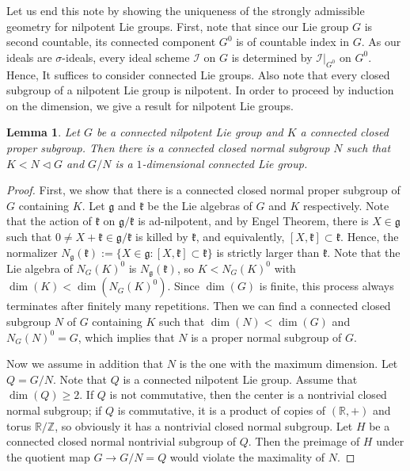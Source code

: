 \documentclass{article}
\newtheorem{lemma}[definition]{Lemma}
\newcommand{\Z}{\mathbb{Z}}
\newcommand{\R}{\mathbb{R}}
\newcommand{\I}{\mathcal{I}}
\begin{document}
Let us end this note by showing the uniqueness of the strongly admissible geometry for nilpotent Lie groups. First, note that since our Lie group $G$ is second countable, its connected component $G^0$ is of countable index in $G$. As our ideals are $\sigma$-ideals, every ideal scheme $\I$ on $G$ is determined by $\I|_{G^0}$ on $G^0$. Hence, It suffices to consider connected Lie groups. Also note that every closed subgroup of a nilpotent Lie group is nilpotent. In order to proceed by induction on the dimension, we give a result for nilpotent Lie groups.

\begin{lemma}
Let $G$ be a connected nilpotent Lie group and $K$ a connected closed proper  subgroup. Then there is a connected closed normal subgroup $N$ such that $K<N\lhd G$ and $G/N$ is a $1$-dimensional connected Lie group.
\end{lemma}

\begin{proof}
First, we show that there is a connected closed normal proper subgroup of $G$ containing $K$. Let $\mathfrak{g}$ and $\mathfrak{k}$ be the Lie algebras of $G$ and $K$ respectively. Note that the action of $\mathfrak{k}$ on $\mathfrak{g}/\mathfrak{k}$ is ad-nilpotent, and by Engel Theorem, there is $X\in \mathfrak{g}$ such that $0\neq X+\mathfrak{k}\in \mathfrak{g}/\mathfrak{k}$ is killed by $\mathfrak{k}$, and equivalently, $[X,\mathfrak{k}] \subset \mathfrak{k}$. Hence, the normalizer
$N_{\mathfrak{g}}(\mathfrak{k}):=\{X\in\mathfrak{g}:[X,\mathfrak{k}]\subset \mathfrak{k}\}$ is strictly larger than $\mathfrak{k}$. Note that the Lie algebra of $N_G(K)^0$ is $N_{\mathfrak{g}}(\mathfrak{k})$, so $K<N_G(K)^0$ with $\dim(K)<\dim(N_G(K)^0)$. Since $\dim (G)$ is finite, this process always terminates after finitely many repetitions. Then we can find a connected closed subgroup $N$ of $G$ containing $K$ such that $\dim(N)<\dim(G)$ and $N_G(N)^0=G$, which implies that $N$ is a proper normal subgroup of $G$.

Now we assume in addition that $N$ is the one with the maximum dimension. Let $Q=G/N$. Note that $Q$ is a connected nilpotent Lie group. Assume that $\dim(Q)\geq 2$. If $Q$ is not commutative, then the center is a nontrivial closed normal subgroup; if $Q$ is commutative, it is a product of copies of $(\R,+)$ and torus $\R/\Z$, so obviously it has a nontrivial closed normal subgroup. Let $H$ be a  connected closed normal nontrivial subgroup of $Q$. Then the preimage of 
$H$ under the quotient map 
$G\rightarrow G/N=Q$ would violate the maximality of 
$N$.
\end{proof}
\end{document}
